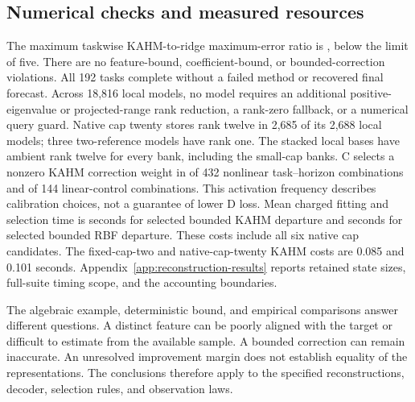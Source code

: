 \subsection{Numerical checks and measured resources}

The maximum taskwise KAHM-to-ridge maximum-error ratio is
\DFMaxErrorRatio{}, below the limit of five. There are no feature-bound,
coefficient-bound, or bounded-correction violations. All 192 tasks complete
without a failed method or recovered final forecast. Across 18,816 local
models, no model requires an additional positive-eigenvalue or projected-range
rank reduction, a rank-zero fallback, or a numerical query guard. Native
cap twenty stores rank twelve in 2,685 of its 2,688 local models; three
two-reference models have rank one. The stacked local bases have ambient
rank twelve for every bank, including the small-cap banks. C selects a
nonzero KAHM correction weight in
\DFKActiveNonlinear{} of 432 nonlinear task--horizon combinations and
\DFKActiveLinear{} of 144 linear-control combinations. This activation
frequency describes calibration choices, not a guarantee of lower D loss.
Mean charged fitting and selection time is \DFKFitSeconds{} seconds
for selected bounded KAHM departure and \DFRFitSeconds{} seconds for
selected bounded RBF departure. These costs include all six native cap
candidates. The fixed-cap-two and native-cap-twenty KAHM costs are 0.085
and 0.101 seconds. Appendix~\ref{app:reconstruction-results} reports
retained state sizes, full-suite timing scope, and the accounting boundaries.

The algebraic example, deterministic bound, and empirical comparisons
answer different questions. A distinct feature can be poorly aligned
with the target or difficult to estimate from the available sample.
A bounded correction can remain inaccurate. An unresolved improvement
margin does not establish equality of the representations. The
conclusions therefore apply to the specified reconstructions, decoder,
selection rules, and observation laws.
